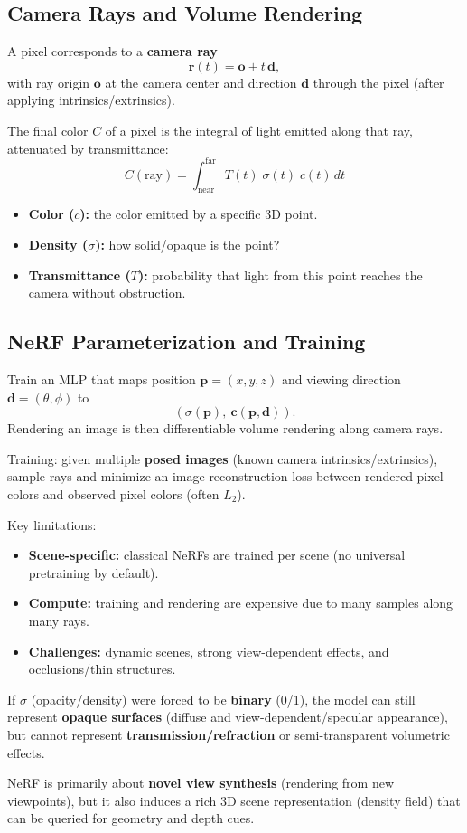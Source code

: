 \documentclass[11pt, oneside]{book}
\newcommand{\vct}[1]{\bm{#1}}           %
\begin{document}
\subsection{Camera Rays and Volume Rendering}

A pixel corresponds to a \textbf{camera ray}
\[
\vct{r}(t)=\vct{o}+t\,\vct{d},
\]
with ray origin $\vct{o}$ at the camera center and direction $\vct{d}$ through the pixel
(after applying intrinsics/extrinsics).

\begin{thmbox}[title={Volume Rendering Equation}]
The final color $C$ of a pixel is the integral of light emitted along that ray, attenuated by transmittance:
\[
C(\text{ray}) = \int_{\text{near}}^{\text{far}} T(t)\;\sigma(t)\;c(t) \,dt
\]
\begin{itemize}
  \item \textbf{Color ($c$):} the color emitted by a specific 3D point.
  \item \textbf{Density ($\sigma$):} how solid/opaque is the point?
  \item \textbf{Transmittance ($T$):} probability that light from this point reaches the camera without obstruction.
\end{itemize}
\end{thmbox}

\subsection{NeRF Parameterization and Training}

\begin{defbox}[title={NeRF}]
Train an MLP that maps position $\vct{p}=(x,y,z)$ and viewing direction $\vct{d}=(\theta,\phi)$ to
\[
(\sigma(\vct{p}),\ \vct{c}(\vct{p},\vct{d})).
\]
Rendering an image is then differentiable volume rendering along camera rays.
\end{defbox}

Training: given multiple \textbf{posed images} (known camera intrinsics/extrinsics), sample rays and minimize
an image reconstruction loss between rendered pixel colors and observed pixel colors (often $L_2$).

Key limitations:
\begin{itemize}
  \item \textbf{Scene-specific:} classical NeRFs are trained per scene (no universal pretraining by default).
  \item \textbf{Compute:} training and rendering are expensive due to many samples along many rays.
  \item \textbf{Challenges:} dynamic scenes, strong view-dependent effects, and occlusions/thin structures.
\end{itemize}

If $\sigma$ (opacity/density) were forced to be \textbf{binary} (0/1), the model can still represent
\textbf{opaque surfaces} (diffuse and view-dependent/specular appearance), but cannot represent
\textbf{transmission/refraction} or semi-transparent volumetric effects.

NeRF is primarily about \textbf{novel view synthesis} (rendering from new viewpoints), but it also induces a rich
3D scene representation (density field) that can be queried for geometry and depth cues.
\end{document}
